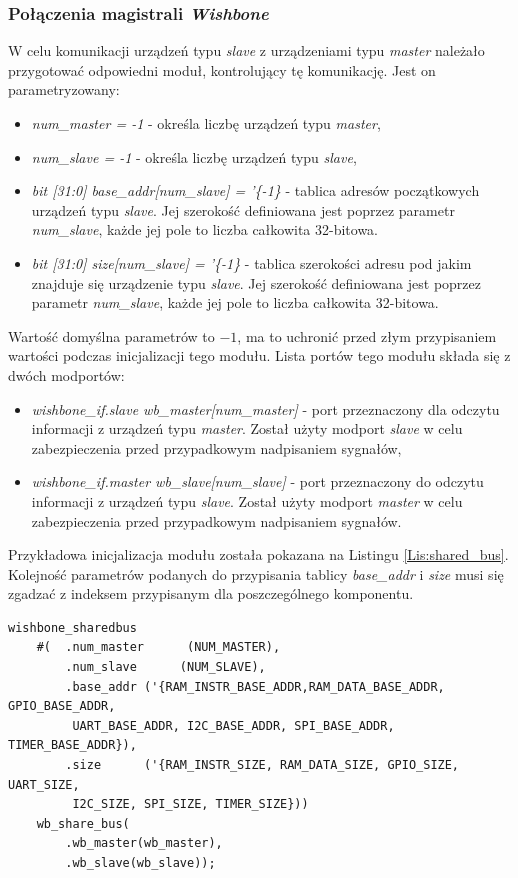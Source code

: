 \documentclass[11pt,a4paper]{article}
\begin{document}
		\subsubsection{Połączenia magistrali \textit{Wishbone}}
		\hspace{5mm}
		W celu komunikacji urządzeń typu \textit{slave} z urządzeniami typu \textit{master} należało przygotować odpowiedni moduł, kontrolujący tę komunikację. Jest on parametryzowany:
		\begin{itemize}
		\item \textit{num\_master = -1} - określa liczbę urządzeń typu \textit{master},
		\item \textit{num\_slave = -1} - określa liczbę urządzeń typu \textit{slave},
		\item \textit{bit [31:0] base\_addr[num\_slave] = '\{-1\}} - tablica adresów początkowych urządzeń typu \textit{slave}. Jej szerokość definiowana jest poprzez parametr \textit{num\_slave}, każde jej pole to liczba całkowita 32-bitowa.
		\item \textit{bit [31:0] size[num\_slave] = '\{-1\} } - tablica szerokości adresu pod jakim znajduje się urządzenie typu \textit{slave}. Jej szerokość definiowana jest poprzez parametr \textit{num\_slave}, każde jej pole to liczba całkowita 32-bitowa.
		\end{itemize}		 
		Wartość domyślna parametrów to $-1$, ma to uchronić przed złym przypisaniem wartości podczas inicjalizacji tego modułu. Lista portów tego modułu składa się z dwóch modportów:
		\begin{itemize}
			\item \textit{wishbone\_if.slave wb\_master[num\_master]} - port przeznaczony dla odczytu informacji z urządzeń typu \textit{master}. Został użyty modport \textit{slave} w celu zabezpieczenia przed przypadkowym nadpisaniem sygnałów,
			\item \textit{wishbone\_if.master wb\_slave[num\_slave]} - port przeznaczony do odczytu informacji z urządzeń typu \textit{slave}. Został użyty modport \textit{master} w celu zabezpieczenia przed przypadkowym nadpisaniem sygnałów.
		\end{itemize}
		Przykładowa inicjalizacja modułu została pokazana na Listingu \ref{Lis:shared_bus}. Kolejność parametrów podanych do przypisania tablicy \textit{base\_addr} i \textit{size} musi się zgadzać z indeksem przypisanym dla poszczególnego komponentu. \\
		\begin{minipage}{\textwidth}
\begin{scriptsize}
\begin{lstlisting}[label=Lis:shared_bus,caption=Przykładowa inicjalizacja modułu \textit{wishbone\_sharedbus}]
	wishbone_sharedbus
	#(	.num_master      (NUM_MASTER),
		.num_slave      (NUM_SLAVE),
		.base_addr ('{RAM_INSTR_BASE_ADDR,RAM_DATA_BASE_ADDR, GPIO_BASE_ADDR,
		 UART_BASE_ADDR, I2C_BASE_ADDR, SPI_BASE_ADDR, TIMER_BASE_ADDR}),
		.size      ('{RAM_INSTR_SIZE, RAM_DATA_SIZE, GPIO_SIZE, UART_SIZE,
		 I2C_SIZE, SPI_SIZE, TIMER_SIZE}))       
	wb_share_bus(
		.wb_master(wb_master),
		.wb_slave(wb_slave));
\end{lstlisting}
\end{scriptsize}
\end{minipage}
\end{document}

